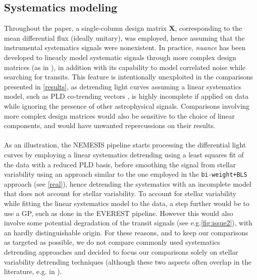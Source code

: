\documentclass[modern,linenumbers]{aastex631}
\newcommand{\nuancemethod}{\textit{nuance}}
\begin{document}
\subsection{Systematics modeling}\label{systematics}
Throughout the paper, a single-column design matrix $\bm{X}$, corresponding to the mean differential flux (ideally unitary), was employed, hence assuming that the instrumental systematics signals were nonexistent. In practice, \nuancemethod{} has been developed to linearly model systematic signals through more complex design matrices (as in \citealt{foreman2016}), in addition with its capability to model correlated noise while searching for transits. This feature is intentionally unexploited in the comparisons presented in \autoref{results}, as detrending light curves assuming a linear systematics model, such as PLD co-trending vectors \citep{pld}, is highly incomplete if applied on data while ignoring the presence of other astrophysical signals. Comparisons involving more complex design matrices would also be sensitive to the choice of linear components, and would have unwanted repercussions on their results.\\\\
As an illustration, the NEMESIS pipeline \citep{nemesis} starts processing the differential light curves by employing a linear systematics detrending using a least squares fit of the data with a reduced PLD basis, before smoothing the signal from stellar variability using an approach similar to the one employed in the \texttt{bi-weight+BLS} approach (see \autoref{real}), hence detrending the systematics with an incomplete model that does not account for stellar variability. To account for stellar variability while fitting the linear systematics model to the data, a step further would be to use a GP, such as done in the EVEREST \citep{everest2} pipeline. However this would also involve some potential degradation of the transit signals (see e.g.\;\autoref{fig:issue2}), with an hardly distinguishable origin. For these reasons, and to keep our comparisons as targeted as possible, we do not compare commonly used systematics detrending approaches and decided to focus our comparisons solely on stellar variability detrending techniques (although these two aspects often overlap in the literature, e.g. in \citealt{everest1}).\\\\
\end{document}
